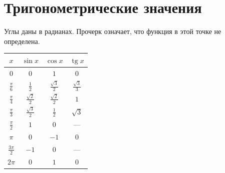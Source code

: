\par\noindent\begin{minipage}{\linewidth}
\section*{Тригонометрические значения}

Углы даны в радианах. Прочерк означает, что функция в этой точке не определена.

\begingroup\renewcommand{\arraystretch}{1.5}\begin{center}\begin{tabular}{|c|c|c|c|}\hline\(x\)&\(\sin x\)&\(\cos x\)&\(\operatorname{tg}x\)\\[3pt]\hline

\(\displaystyle 0\)&\(\displaystyle 0\)&\(\displaystyle 1\)&\(\displaystyle 0\)\\[3pt]\hline

\(\displaystyle \frac\pi6\)&\(\displaystyle \frac12\)&\(\displaystyle \frac{\sqrt3}2\)&\(\displaystyle \frac{\sqrt3}3\)\\[3pt]\hline

\(\displaystyle \frac\pi4\)&\(\displaystyle \frac{\sqrt2}2\)&\(\displaystyle \frac{\sqrt2}2\)&\(\displaystyle 1\)\\[3pt]\hline

\(\displaystyle \frac\pi3\)&\(\displaystyle \frac{\sqrt3}2\)&\(\displaystyle \frac12\)&\(\displaystyle \sqrt3\)\\[3pt]\hline

\(\displaystyle \frac\pi2\)&\(\displaystyle 1\)&\(\displaystyle 0\)&---\\[3pt]\hline

\(\displaystyle \pi\)&\(\displaystyle 0\)&\(\displaystyle -1\)&\(\displaystyle 0\)\\[3pt]\hline

\(\displaystyle \frac{3\pi}2\)&\(\displaystyle -1\)&\(\displaystyle 0\)&---\\[3pt]\hline

\(\displaystyle 2\pi\)&\(\displaystyle 0\)&\(\displaystyle 1\)&\(\displaystyle 0\)\\[3pt]\hline

\end{tabular}\end{center}\endgroup

\end{minipage}\par

